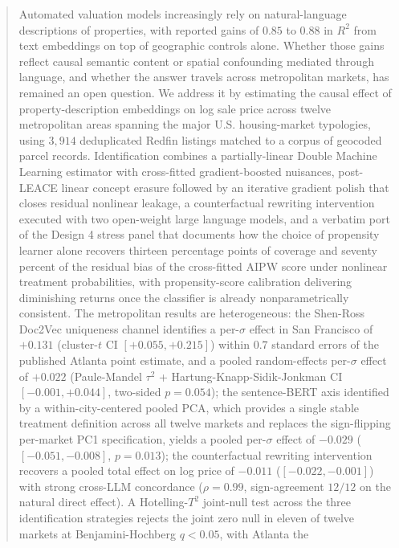 \begin{abstract}

Automated valuation models increasingly rely on natural-language
descriptions of properties, with reported gains of $0.85$ to $0.88$ in
$R^2$ from text embeddings on top of geographic controls alone.
Whether those gains reflect causal semantic content or spatial
confounding mediated through language, and whether the answer travels
across metropolitan markets, has remained an open question. We
address it by estimating the causal effect of property-description
embeddings on log sale price across twelve metropolitan areas spanning the major U.S. housing-market typologies, using $3{,}914$ deduplicated Redfin listings matched to a corpus of geocoded parcel records.
Identification combines a partially-linear Double Machine Learning
estimator with cross-fitted gradient-boosted nuisances, post-LEACE
linear concept erasure followed by an iterative gradient polish that
closes residual nonlinear leakage, a counterfactual rewriting
intervention executed with two open-weight large language models, and
a verbatim port of the \citet{ballinari2024improving} Design 4 stress
panel that documents how the choice of propensity learner alone
recovers thirteen percentage points of coverage and seventy percent of
the residual bias of the cross-fitted AIPW score under nonlinear
treatment probabilities, with propensity-score calibration delivering
diminishing returns once the classifier is already nonparametrically
consistent. The metropolitan results are heterogeneous: the
Shen-Ross Doc2Vec uniqueness channel identifies a per-$\sigma$ effect
in San Francisco of $+0.131$ (cluster-$t$ CI $[+0.055, +0.215]$) within $0.7$
standard errors of the published Atlanta point estimate, and a pooled
random-effects per-$\sigma$ effect of $+0.022$ (Paule-Mandel
$\tau^2$ + Hartung-Knapp-Sidik-Jonkman CI $[-0.001, +0.044]$,
two-sided $p = 0.054$); the sentence-BERT axis identified by a
within-city-centered pooled PCA, which provides a single stable
treatment definition across all twelve markets and replaces the
sign-flipping per-market PC1 specification, yields a pooled per-$\sigma$
effect of $-0.029$ ($[-0.051, -0.008]$, $p = 0.013$); the
counterfactual rewriting intervention recovers a pooled total effect
on log price of $-0.011$ ($[-0.022, -0.001]$) with strong cross-LLM
concordance ($\rho = 0.99$, sign-agreement $12/12$ on the natural
direct effect). A Hotelling-$T^2$ joint-null test across the three
identification strategies rejects the joint zero null in eleven of
twelve markets at Benjamini-Hochberg $q < 0.05$, with Atlanta the

\end{abstract}
